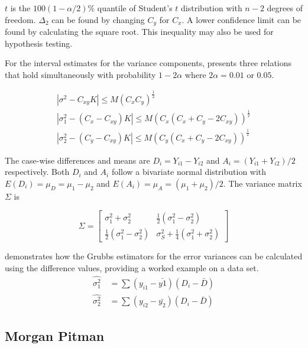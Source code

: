 \documentclass[12pt, a4paper]{article}
\begin{document}
	$t$ is the $100(1-\alpha/2)\%$ quantile of Student's $t$
	distribution with $n-2$ degrees of freedom. $\Delta_{2}$ can be
	found by changing $C_{y}$ for $C_{x}$. A lower confidence limit
	can be found by calculating the square root. This inequality may
	also be used for hypothesis testing.
	
	For the interval estimates for the variance components,
	\citet{Thompson} presents three relations that hold simultaneously
	with probability $1-2\alpha$ where $2\alpha=0.01$ or $0.05$.
	
	\begin{eqnarray}
		|\sigma^2-C_{xy}K|\leqslant M(C_{x}C_{y})^{\frac{1}{2}}\\
		|\sigma^2_{1}-(C_{x}-C_{xy})K|\leqslant M(C_{x}(C_{x}+C_{y}-2C_{xy}))^{\frac{1}{2}}\nonumber\\
		|\sigma^2_{2}-(C_{y}-C_{xy})K|\leqslant
		M(C_{y}(C_{x}+C_{y}-2C_{xy}))^{\frac{1}{2}}\nonumber
	\end{eqnarray}
	
	The case-wise differences and means are $D_{i} = Y_{i1}-Y_{i2}$
	and $A_{i} = (Y_{i1}+Y_{i2})/2$  respectively. Both $D_{i}$ and
	$A_{i}$ follow a bivariate normal distribution with $E(D_{i})=
	\mu_{D} = \mu_{1} - \mu_{2}$ and $E(A_{i})= \mu_{A} = (\mu_{1} +
	\mu_{2})/2$. The variance matrix $\Sigma$ is
	
	\begin{equation}
		\Sigma = \left[\begin{matrix}
			\sigma^{2}_{1}+\sigma^{2}_{2}&\frac{1}{2}(\sigma^{2}_{1}-\sigma^{2}_{2})\\
			\frac{1}{2}(\sigma^{2}_{1}-\sigma^{2}_{2})&\sigma^{2}_{S}+
			\frac{1}{4}(\sigma^{2}_{1}+\sigma^{2}_{2})
		\end{matrix} \right]
	\end{equation}
	
	
	
	
	
	\citet{Kinsella} demonstrates how the Grubbs estimators for the
	error variances can be calculated using the difference values,
	providing a worked example on a data set.
	\begin{eqnarray}
		\hat{\sigma^{2}_{1}}
		\quad=\sum{(y_{i1}-\bar{y{1}})(D_{i}-\bar{D})}\\
		\hat{\sigma^{2}_{2}} \quad=
		\sum{(y_{i2}-\bar{y_{2}})(D_{i}-\bar{D})} \nonumber
	\end{eqnarray}
	
	
	\subsection{Morgan Pitman}
	
\end{document}
